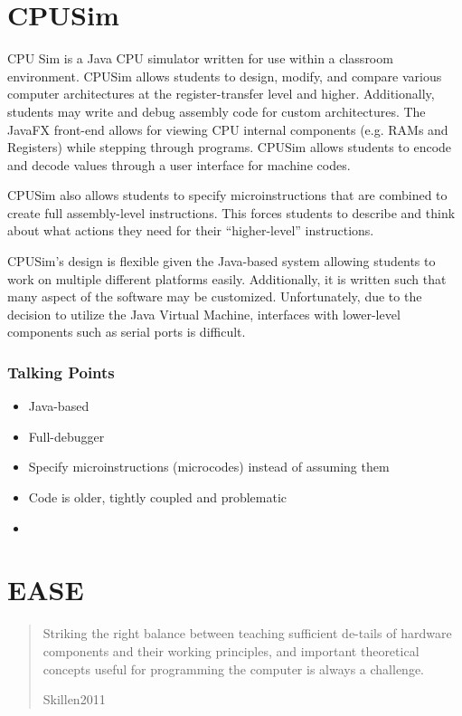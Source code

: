 \section{CPUSim \cite{Skrien2001}}

CPU Sim is a Java CPU simulator written for use within a classroom environment. CPUSim allows students to design, modify, and compare various computer architectures at the register-transfer level and higher. Additionally, students may write and debug assembly code for custom architectures. The JavaFX front-end allows for viewing CPU internal components (e.g. RAMs and Registers) while stepping through programs. CPUSim allows students to encode and decode values through a user interface for machine codes. 

CPUSim also allows students to specify microinstructions that are combined to create full assembly-level instructions. This forces students to describe and think about what actions they need for their ``higher-level'' instructions. 

CPUSim's design is flexible given the Java-based system allowing students to work on multiple different platforms easily. Additionally, it is written such that many aspect of the software may be customized. Unfortunately, due to the decision to utilize the Java Virtual Machine, interfaces with lower-level components such as serial ports is difficult. 

\subsubsection{Talking Points}

\begin{itemize}
\item Java-based
\item Full-debugger
\item Specify microinstructions (microcodes) instead of assuming them
\item Code is older, tightly coupled and problematic
\item 
\end{itemize}

\section{EASE \cite{Skillen2011}}

\blockquote[Skillen2011]{Striking the right balance between teaching sufficient de-tails of hardware components and their working principles, and important theoretical concepts useful for programming the computer is always a challenge.}

